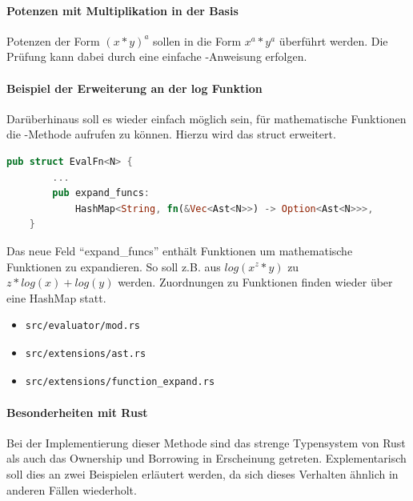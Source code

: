 \documentclass[11pt,a4paper, ngerman]{article}
\begin{document}
\paragraph{Potenzen mit Multiplikation in der Basis} Potenzen der Form $(x*y)^a$ sollen in die Form $x^a*y^a$ überführt werden. Die Prüfung kann dabei durch eine einfache -Anweisung erfolgen.

\paragraph{Beispiel der Erweiterung an der log Funktion} Darüberhinaus soll es wieder einfach möglich sein, für mathematische Funktionen die -Methode aufrufen zu können. Hierzu wird das struct  erweitert.

\begin{lstlisting}[language=rust, caption={EvalFn nach expand}]
    pub struct EvalFn<N> {
        ...
        pub expand_funcs: 
            HashMap<String, fn(&Vec<Ast<N>>) -> Option<Ast<N>>>,
    }
\end{lstlisting}

Das neue Feld ``expand\_funcs'' enthält Funktionen um mathematische Funktionen zu expandieren. So soll z.B. aus $log(x^z*y)$ zu $z*log(x)+log(y)$ werden. Zuordnungen zu Funktionen finden wieder über eine HashMap statt.

\begin{itemize}
    \item \begin{verbatim}src/evaluator/mod.rs\end{verbatim}
    \item \begin{verbatim}src/extensions/ast.rs\end{verbatim}
    \item \begin{verbatim}src/extensions/function_expand.rs\end{verbatim}
\end{itemize}

\paragraph{Besonderheiten mit Rust} Bei der Implementierung dieser Methode sind das strenge Typensystem von Rust als auch das Ownership und Borrowing in Erscheinung getreten. Explementarisch soll dies an zwei Beispielen erläutert werden, da sich dieses Verhalten ähnlich in anderen Fällen wiederholt.
\end{document}
